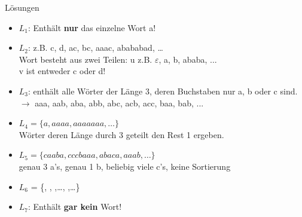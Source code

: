 \documentclass[10pt]{beamer}
\newcommand{\emptyWord}{\varepsilon}
\begin{document}
{
\begin{frame}{Lösungen}
  \begin{itemize}[<+- | alert@+>]
        \item 
            $L_1$: Enthält \textbf{nur} das einzelne Wort a!
        \item
            $L_2$: z.B. c, d, ac, bc, aaac, abababad, \dots\\
            Wort besteht aus zwei Teilen: u z.B. $\emptyWord$, a, b, ababa, ...\\ v ist entweder c oder d!
        \item
            $L_3$: enthält alle Wörter der Länge 3, deren Buchstaben nur a, b oder c sind.\\
            $\rightarrow$ aaa, aab, aba, abb, abc, acb, acc, baa, bab, ...
        \item
            $L_4 = \{a, aaaa, aaaaaaa, \dots\}$\\
            Wörter deren Länge durch 3 geteilt den Rest 1 ergeben.
        \item
            $L_5 = \{caaba, cccbaaa, abaca, aaab, \dots\}$\\
            genau 3 a's, genau 1 b, beliebig viele c's, keine Sortierung
        \item
            $L_6$ = \{\Stopsign, \Rewind \Stopsign, \MoveUp \Stopsign,\dots\;, \MoveDown \Rewind \MoveDown \Stopsign,\dots\}
            \item $L_7$: Enthält \textbf{gar kein} Wort!
    \end{itemize}
\end{frame}
}
\end{document}
